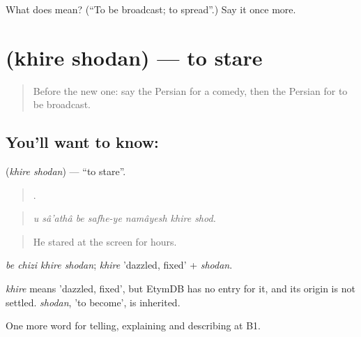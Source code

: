 \begin{tcolorbox}[breakable,colback=teal!4,colframe=teal!35!black,title={Before you move on}]
What does   mean? (\textquotedblleft{}To be broadcast; to spread\textquotedblright{}.) Say it once more.
\end{tcolorbox}
\section[\texorpdfstring{\fa{خیره} \fa{شدن} (khire shodan)}{خیره شدن (khire shodan)}]{  (khire shodan) — to stare}

\label{lesson:FA-C533-khire-shodan}



\begin{quote}
Before the new one: say the Persian for a comedy, then the Persian for to be broadcast.
\end{quote}

\subsection*{You'll want to know:  }
\textbf{ } (\emph{khire shodan}) — \textquotedblleft{}to stare\textquotedblright{}.

\begin{quote}
      .
\end{quote}

\begin{quote}
\emph{u sâ'athâ be safhe-ye namâyesh khire shod.}
\end{quote}

\begin{quote}
He stared at the screen for hours.
\end{quote}

\emph{be chizi khire shodan}; \emph{khire} 'dazzled, fixed' + \emph{shodan}.

\begin{cousinweb}
\emph{khire} means 'dazzled, fixed', but EtymDB has no entry for it, and its origin is not settled. \emph{shodan}, 'to become', is inherited.
\end{cousinweb}

\begin{grammarlens}[title={What you've built}]
One more word for telling, explaining and describing at B1.
\end{grammarlens}

